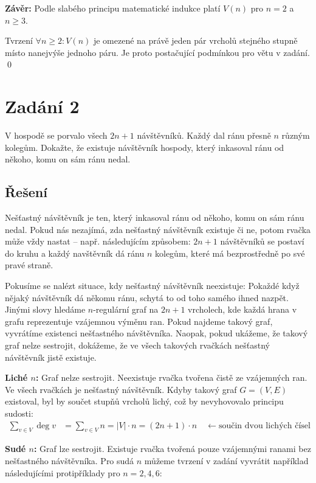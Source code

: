 \documentclass{article}
\begin{document}
\textbf{Závěr:}
Podle slabého principu matematické indukce platí $V(n)$ pro $n = 2$ a $n \ge 3$.

Tvrzení $\forall n \ge 2 \colon V(n)$ je omezené na právě jeden pár vrcholů stejného stupně místo nanejvýše jednoho páru. Je proto postačující podmínkou pro větu v zadání.
\qed

\newpage
\section*{Zadání 2}

V hospodě se porvalo všech $2n+1$ návštěvníků. Každý dal ránu přesně $n$ různým kolegům. Dokažte, že existuje návštěvník hospody, který inkasoval ránu od někoho, komu on sám ránu nedal.

\subsection*{Řešení}

Nešťastný návštěvník je ten, který inkasoval ránu od někoho, komu on sám ránu nedal. Pokud nás nezajímá, zda nešťastný návštěvník existuje či ne, potom rvačka může vždy nastat -- např. následujícím způsobem: $2n + 1$ návštěvníků se postaví do kruhu a každý navštěvník dá ránu $n$ kolegům, které má bezprostředně po své pravé straně.

Pokusíme se nalézt situace, kdy nešťastný návštěvník neexistuje: Pokaždé když nějaký návštěvník dá někomu ránu, schytá to od toho samého ihned nazpět. Jinými slovy hledáme $n$-regulární graf na $2n+1$ vrcholech, kde každá hrana v grafu reprezentuje vzájemnou výměnu ran.
Pokud najdeme takový graf, vyvrátíme existenci nešťastného návštěvníka. Naopak, pokud ukážeme, že takový graf nelze sestrojit, dokážeme, že ve všech takových rvačkách nešťastný návštěvník jistě existuje.

\textbf{Liché $n$:} Graf nelze sestrojit. Neexistuje rvačka tvořena čistě ze vzájemných ran. Ve všech rvačkách je nešťastný návštěvník.
Kdyby takový graf $G = (V, E)$ existoval, byl by součet stupňů vrcholů lichý, což by nevyhovovalo principu sudosti:
\begin{align*}
    \sum_{v \in V} \deg v & = \sum_{v \in V} n = |V| \cdot n = (2n + 1) \cdot n \quad \leftarrow \text{součin dvou lichých čísel}
\end{align*}

\textbf{Sudé $n$:} Graf lze sestrojit. Existuje rvačka tvořená pouze vzájemnými ranami bez nešťastného návštěvníka.
Pro sudá $n$ můžeme tvrzení v zadání vyvrátit například následujícími protipříklady pro $n=2, 4, 6$:
\end{document}
